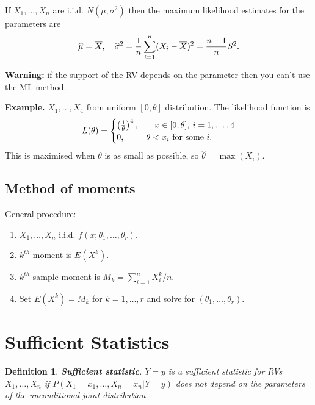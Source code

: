 \documentclass[10pt, two column]{article}
\newtheorem{definition}{Definition}[subsection]
\begin{document}
If $X_{1}, \dots, X_{n}$ are i.i.d. $N(\mu, \sigma^{2})$ then the maximum likelihood estimates for the parameters are \vspace{-6pt}
\[ \widehat{\mu} = \overline{X}, \quad \widehat{\sigma}^{2} = \frac{1}{n}\sum_{i=1}^{n} (X_{i}-\overline{X})^{2} = \frac{n-1}{n}S^{2}. \vspace{-6pt} \]

{\bf Warning:} if the support of the RV depends on the parameter then you can't use the ML method.

{\bf Example.} $X_{1}, \dots, X_{4}$ from uniform $[0, \theta]$ distribution. The likelihood function is \vspace{-6pt}
\[
L(\theta ) = \begin{cases}
\left( \frac{1}{\theta} \right)^{4}, &\quad x \in [0, \theta], \: i = 1, \dots, 4  \\
0, &\theta < x_{i} \text{ for some } i. 
\end{cases} \vspace{-6pt}
\]
This is maximised when $\theta$ is as small as possible, so $\widehat{\theta} = \max(X_{i})$. 

\subsection{Method of moments}

General procedure:
\begin{enumerate}
\item $X_{1}, \dots, X_{n}$ i.i.d. $f(x; \theta_{1}, \dots, \theta_{r})$. 
\item $k^{th}$ moment is $E(X^{k})$. 
\item $k^{th}$ sample moment is $M_{k} = \sum_{i=1}^{n}X_{i}^{k}/n$. 
\item Set $E(X^{k}) = M_{k}$ for $k = 1, \dots, r$ and solve for $(\theta_{1}, \dots, \theta_{r})$.
\end{enumerate}

\section{Sufficient Statistics}

\begin{definition}
{\bf Sufficient statistic}. $Y=y$ is a sufficient statistic for RVs $X_{1}, \dots, X_{n}$ if $P(X_{1}=x_{1}, \dots, X_{n}=x_{n} \vert Y=y)$ does not depend on the parameters of the unconditional joint distribution. \\
\end{definition}
\end{document}
